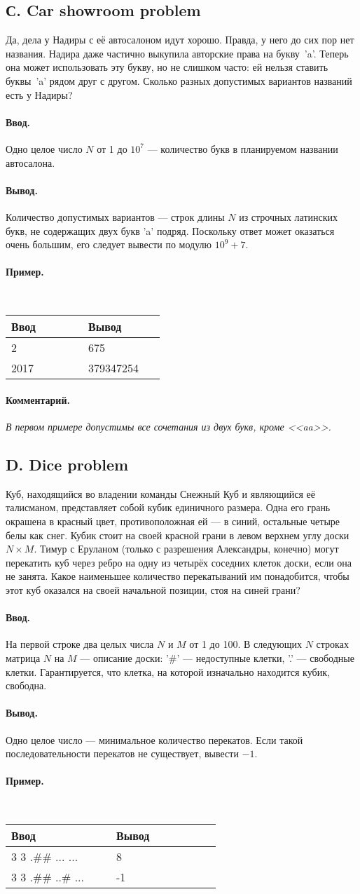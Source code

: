 \documentclass[12pt, a4paper]{article}
\newcommand{\informat}[1]
{
	\paragraph{Ввод.\\} #1
}
\newcommand{\outformat}[1]
{
	\paragraph{Вывод.\\} #1
}
\newcommand{\examplee}[4]
{
	\paragraph{Пример.\\}
	{\tt
	\begin{tabular}{|p{0.4\linewidth}|p{0.4\linewidth}|}
	\hline
	Ввод 	& Вывод  	\\
	\hline
	#1 		& #2 		\\
	\hline
	#3		& #4		\\
	\hline
	\end{tabular}
	}
}
\newcommand{\excomm}[1]
{
	\paragraph{Комментарий. \\}
	\textit{#1}
}
\begin{document}
\subsection*{С. Car showroom problem}


Да, дела у Надиры с её автосалоном идут хорошо. Правда, у него до сих пор нет названия. Надира даже частично выкупила авторские права на букву~'a'. Теперь она может использовать эту букву, но не слишком часто: ей нельзя ставить буквы~'a' рядом друг с другом. Сколько разных допустимых вариантов названий есть у Надиры?

\informat{Одно целое число $N$ от 1 до $10^7$ --- количество букв в планируемом названии автосалона.}
 
\outformat{Количество допустимых вариантов --- строк длины $N$ из строчных латинских букв, не содержащих двух букв 'a' подряд. Поскольку ответ может оказаться очень большим, его следует вывести по модулю $10^9 + 7$.}
 
\examplee{2}{675}{2017}{379347254}
 
\excomm{В первом примере допустимы все сочетания из двух букв, кроме <<aa>>.}


 
\subsection*{D. Dice problem}


Куб, находящийся во владении команды Снежный Куб и являющийся её талисманом, представляет собой кубик единичного размера. Одна его грань окрашена в красный цвет, противоположная ей --- в синий, остальные четыре белы как снег. Кубик стоит на своей красной грани в левом верхнем углу доски $N \times M$. Тимур с Еруланом (только с разрешения Александры, конечно) могут перекатить куб через ребро на одну из четырёх соседних клеток доски, если она не занята. Какое наименьшее количество перекатываний им понадобится, чтобы этот куб оказался на своей начальной позиции, стоя на синей грани?

\informat{На первой строке два целых числа $N$ и $M$ от 1 до 100. В следующих $N$ строках матрица $N$ на $M$ --- описание доски: '\#' --- недоступные клетки, '.' --- свободные клетки. Гарантируется, что клетка, на которой изначально находится кубик, свободна.}
 
\outformat{Одно целое число --- минимальное количество перекатов. Если такой по\-сле\-до\-ва\-тель\-нос\-ти перекатов не существует, вывести $-1$.}

\examplee{3 3 \newline
.\#\# \newline
...\newline
...}
{8}
{3 3 \newline
.\#\# \newline
..\#\newline
...}
{-1}
\end{document}
